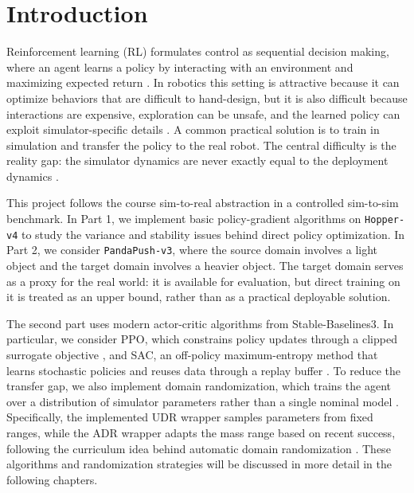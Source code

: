\section{Introduction}
Reinforcement learning (RL) formulates control as sequential decision making, where an agent learns a policy by interacting with an environment and maximizing expected return \cite{sutton2018reinforcement}. In robotics this setting is attractive because it can optimize behaviors that are difficult to hand-design, but it is also difficult because interactions are expensive, exploration can be unsafe, and the learned policy can exploit simulator-specific details \cite{kober2013reinforcement,kormushev2013reinforcement}. A common practical solution is to train in simulation and transfer the policy to the real robot. The central difficulty is the reality gap: the simulator dynamics are never exactly equal to the deployment dynamics \cite{hofer2020perspectives}.

This project follows the course sim-to-real abstraction in a controlled sim-to-sim benchmark. In Part 1, we implement basic policy-gradient algorithms on \texttt{Hopper-v4} to study the variance and stability issues behind direct policy optimization. In Part 2, we consider \texttt{PandaPush-v3}, where the source domain involves a light object and the target domain involves a heavier object. The target domain serves as a proxy for the real world: it is available for evaluation, but direct training on it is treated as an upper bound, rather than as a practical deployable solution.

The second part uses modern actor-critic algorithms from Stable-Baselines3. In particular, we consider PPO, which constrains policy updates through a clipped surrogate objective \cite{schulman2017ppo}, and SAC, an off-policy maximum-entropy method that learns stochastic policies and reuses data through a replay buffer \cite{haarnoja2018sac}. To reduce the transfer gap, we also implement domain randomization, which trains the agent over a distribution of simulator parameters rather than a single nominal model \cite{tobin2017domain,peng2018dynamics,muratore2022robot}. Specifically, the implemented UDR wrapper samples parameters from fixed ranges, while the ADR wrapper adapts the mass range based on recent success, following the curriculum idea behind automatic domain randomization \cite{akkaya2019solving}. These algorithms and randomization strategies will be discussed in more detail in the following chapters.

